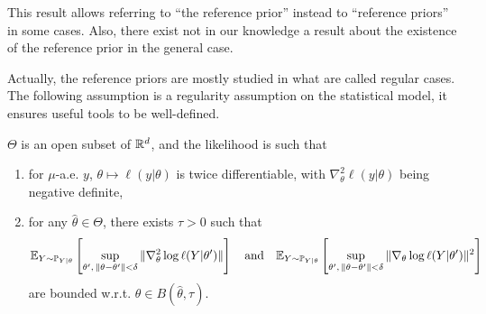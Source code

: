 This result allows referring to ``the reference prior'' instead to ``reference priors'' in some cases. %
Also, there exist not in our knowledge a result about the existence of the reference prior in the general case.

Actually, the reference priors are mostly studied in what are called regular cases.
The following assumption is a regularity assumption on the statistical model, it ensures useful tools to be well-defined.
\begin{assu}\label{assu:intro-ref:jeffreysexist}
    $\Theta$ is an open subset of $\mathbb{R}^d$, and the likelihood is such that
    \begin{enumerate}
        \item for $\mu$-a.e. $y$, $\theta\mapsto\ell(y|\theta)$ is twice differentiable, with $\nabla^2_\theta\ell(y|\theta)$ being negative definite,
        \item for any $\hat\theta\in\Theta$, there exists $\tau>0$ such that
        \begin{equation}
            \mathbb{E}_{Y\sim\mathbb{P}_{Y|\theta}}\left[\sup_{\theta',\,\|\theta-\theta'\|<\delta} \|\nabla^2_\theta\log\ell(Y|\theta')\| \right]\quad\text{and}\quad \mathbb{E}_{Y\sim\mathbb{P}_{Y|\theta}}\left[\sup_{\theta',\,\|\theta-\theta'\|<\delta}\|\nabla_\theta\log\ell(Y|\theta')\|^2\right]
        \end{equation}
        are bounded w.r.t. $\theta\in B(\hat\theta,\tau)$.
    \end{enumerate}
\end{assu}

